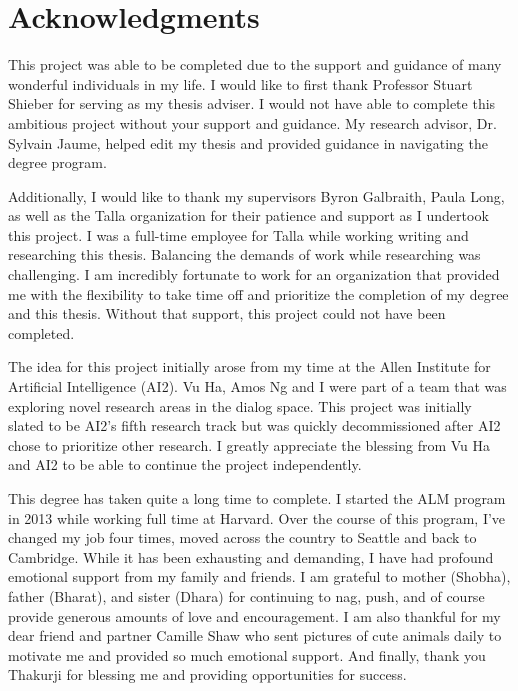 
\chapter*{Acknowledgments}

This project was able to be completed due to the support and guidance of many wonderful individuals in my life. I would like to first thank Professor Stuart Shieber for serving as my thesis adviser. I would not have able to complete this ambitious project without your support and guidance. My research advisor, Dr. Sylvain Jaume, helped edit my thesis and provided guidance in navigating the degree program. 

Additionally, I would like to thank my supervisors Byron Galbraith, Paula Long, as well as the Talla organization for their patience and support as I undertook this project. I was a full-time employee for Talla while working writing and researching this thesis. Balancing the demands of work while researching was challenging. I am incredibly fortunate to work for an organization that provided me with the flexibility to take time off and prioritize the completion of my degree and this thesis. Without that support, this project could not have been completed.

The idea for this project initially arose from my time at the Allen Institute for Artificial Intelligence (AI2). Vu Ha, Amos Ng and I were part of a team that was exploring novel research areas in the dialog space. This project was initially slated to be AI2's fifth research track but was quickly decommissioned after AI2 chose to prioritize other research. I greatly appreciate the blessing from Vu Ha and AI2 to be able to continue the project independently. 

This degree has taken quite a long time to complete. I started the ALM program in 2013 while working full time at Harvard. Over the course of this program, I've changed my job four times, moved across the country to Seattle and back to Cambridge. While it has been exhausting and demanding, I have had profound emotional support from my family and friends. I am grateful to mother (Shobha), father (Bharat), and sister (Dhara) for continuing to nag, push, and of course provide generous amounts of love and encouragement. I am also thankful for my dear friend and partner Camille Shaw who sent pictures of cute animals daily to motivate me and provided so much emotional support. And finally, thank you Thakurji for blessing me and providing opportunities for success.  


